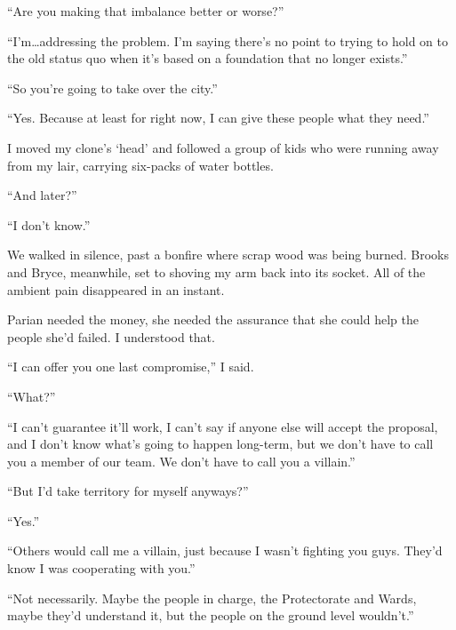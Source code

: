 ``Are you making that imbalance better or worse?''



``I'm\ldots addressing the problem.  I'm saying there's no point to trying to hold on to the old status quo when it's based on a foundation that no longer exists.''



``So you're going to take over the city.''



``Yes.  Because at least for right now, I can give these people what they need.''



I moved my clone's `head' and followed a group of kids who were running away from my lair, carrying six-packs of water bottles.



``And later?''



``I don't know.''



We walked in silence, past a bonfire where scrap wood was being burned.  Brooks and Bryce, meanwhile, set to shoving my arm back into its socket.  All of the ambient pain disappeared in an instant.



Parian needed the money, she needed the assurance that she could help the people she'd failed.  I understood that.



``I can offer you one last compromise,'' I said.



``What?''



``I can't guarantee it'll work, I can't say if anyone else will accept the proposal, and I don't know what's going to happen long-term, but we don't have to call you a member of our team.  We don't have to call you a villain.''



``But I'd take territory for myself anyways?''



``Yes.''



``Others would call me a villain, just because I wasn't fighting you guys.  They'd know I was cooperating with you.''



``Not necessarily.  Maybe the people in charge, the Protectorate and Wards, maybe they'd understand it, but the people on the ground level wouldn't.''



